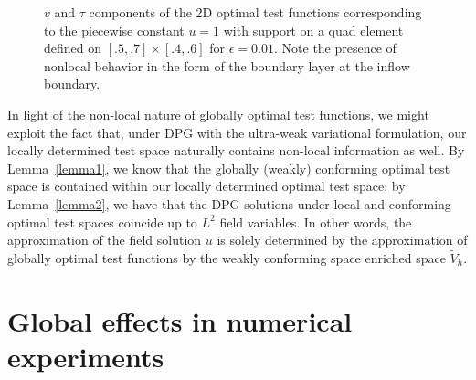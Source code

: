 \documentclass[11pt,onecolumn]{scrartcl}
\begin{document}
\begin{figure}[!h]
\centering
{}
\caption{$v$ and $\tau$ components of the 2D optimal test functions corresponding to the piecewise constant $u=1$ with support on a quad element defined on $[.5,.7]\times[.4,.6]$ for $\epsilon = 0.01$. Note the presence of nonlocal behavior in the form of the boundary layer at the inflow boundary.}
\label{fig:optTestBoundaryGlobal}
\end{figure}

In light of the non-local nature of globally optimal test functions, we might exploit the fact that, under DPG with the ultra-weak variational formulation, our locally determined test space naturally contains non-local information as well.  By Lemma~\ref{lemma1}, we know that the globally (weakly) conforming optimal test space is contained within our locally determined optimal test space; by Lemma~\ref{lemma2}, we have that the DPG solutions under local and conforming optimal test spaces coincide up to $L^2$ field variables.  In other words, the approximation of the field solution $u$ is solely determined by the approximation of globally optimal test functions by the weakly conforming space enriched space $\tilde{V}_h$.  

\section{Global effects in numerical experiments}
\end{document}
